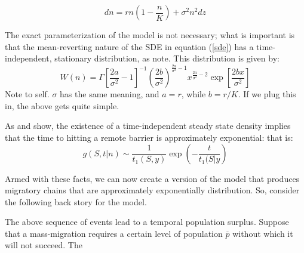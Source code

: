 \documentclass[11pt]{article}
\begin{document}
\begin{equation}
dn=rn\left(1-\frac{n}{K}\right)+\sigma^2n^2dz
\end{equation} \label{sde}

The exact parameterization of the model is not necessary; what is important is that the mean-reverting nature of the SDE in equation (\ref{sde}) has a time-independent, stationary distribution, as \cite{rdgn99} note. This distribution is given by:
\begin{equation*}
W(n) = \Gamma\left[\frac{2a}{\sigma^2}-1\right]^{-1}\left(\frac{2b}{\sigma^2}\right)^{\frac{2a}{\sigma^2}-1}x^{\frac{2a}{\sigma^2}-2}\exp\left[\frac{2bx}{\sigma^2}\right]
\end{equation*}
Note to self. $\sigma$ has the same meaning, and $a=r$, while $b=r / K$. If we plug this in, the above gets quite simple. 

As \cite{rdgn99} and \cite{nrs99} show, the existence of a time-independent steady state density implies that the time to hitting a remote barrier is approximately exponential: that is:
\begin{equation*}
g(S,t|n) \sim \frac{1}{t_1(S,y)}\exp\left(-\frac{t}{t_1(S|y}\right) 
\end{equation*}

Armed with these facts, we can now create a version of the model that produces migratory chains that are approximately exponentially distribution. So, consider the following back story for the model.

The above sequence of events lead to a temporal population surplus. Suppose that a mass-migration requires a certain level of population $$ without which it will not succeed. The
\end{document}
